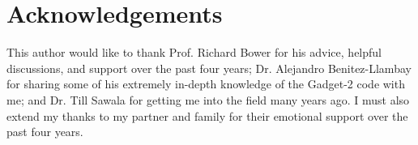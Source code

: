 \section{Acknowledgements}

This author would like to thank Prof. Richard Bower for his advice, helpful discussions, and support over the past four years; Dr. Alejandro Benitez-Llambay for sharing some of his extremely in-depth knowledge of the Gadget-2 code with me; and Dr. Till Sawala for getting me into the field many years ago. I must also extend my thanks to my partner and family for their emotional support over the past four years.
